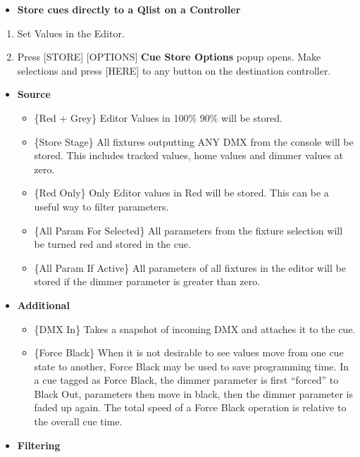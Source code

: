 \documentclass[
]{article}
\providecommand{\tightlist}{%
  \setlength{\itemsep}{0pt}\setlength{\parskip}{0pt}}
\begin{document}
\begin{itemize}
\tightlist
\item
  \textbf{Store cues directly to a Qlist on a Controller}
\end{itemize}

\begin{enumerate}
\def\labelenumi{\arabic{enumi}.}
\item
  Set Values in the Editor.
\item
  Press {[}STORE{]} {[}OPTIONS{]} \textbf{Cue Store Options} popup opens. Make selections and press {[}HERE{]} to any button on the destination controller.
\end{enumerate}

\begin{itemize}
\item
  \textbf{Source}

  \begin{itemize}
  \item
    \{Red + Grey\} Editor Values in 100\% 90\% will be stored.
  \item
    \{Store Stage\} All fixtures outputting ANY DMX from the console will be stored. This includes tracked values, home values and dimmer values at zero.
  \item
    \{Red Only\} Only Editor values in Red will be stored. This can be a useful way to filter parameters.
  \item
    \{All Param For Selected\} All parameters from the fixture selection will be turned red and stored in the cue.
  \item
    \{All Param If Active\} All parameters of all fixtures in the editor will be stored if the dimmer parameter is greater than zero.
  \end{itemize}
\item
  \textbf{Additional}

  \begin{itemize}
  \item
    \{DMX In\} Takes a snapshot of incoming DMX and attaches it to the cue.
  \item
    \{Force Black\} When it is not desirable to see values move from one cue state to another, Force Black may be used to save programming time. In a cue tagged as Force Black, the dimmer parameter is first ``forced'' to Black Out, parameters then move in black, then the dimmer parameter is faded up again. The total speed of a Force Black operation is relative to the overall cue time.
  \end{itemize}
\item
  \textbf{Filtering}


\end{itemize}
\end{document}
